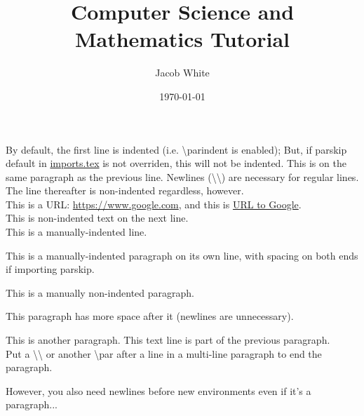 \documentclass{article}
\title{Computer Science and Mathematics Tutorial}
\author{Jacob White}
\date{\today}
\begin{document}
\maketitle
By default, the first line is indented (i.e. \textbackslash{parindent} is enabled); But, if parskip default in \href{run:./imports.tex}{imports.tex} is not overriden, this will not be indented.
This is on the same paragraph as the previous line. Newlines (\textbackslash \textbackslash) are necessary for regular lines.\\
The line thereafter is non-indented regardless, however.\\
This is a URL: \url{https://www.google.com}, and this is \href{https://www.google.com}{URL to Google}.\\
This is non-indented text on the next line.\\
\indent This is a manually-indented line.
\par\forceindent This is a manually-indented paragraph on its own line, with spacing on both ends if importing parskip.
\par\noindent This is a manually non-indented paragraph.
\par This paragraph has more space after it (newlines are unnecessary). \\
\par This is another paragraph.
This text line is part of the previous paragraph.\\
Put a \textbackslash\textbackslash\xspace or another \textbackslash{par} after a line in a multi-line paragraph to end the paragraph. 
\par\noindent However, you also need newlines before new environments even if it's a paragraph...\\
\end{document}

